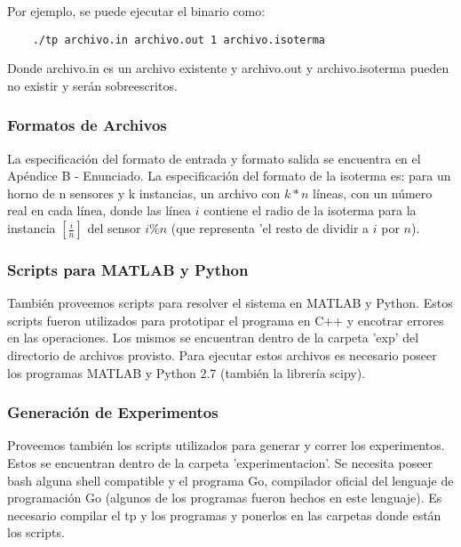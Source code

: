 Por ejemplo, se puede ejecutar el binario como:

\begin{verbatim}
    ./tp archivo.in archivo.out 1 archivo.isoterma
\end{verbatim}

Donde archivo.in es un archivo existente y archivo.out y archivo.isoterma pueden no existir y serán sobreescritos.

\subsubsection{Formatos de Archivos}

La especificación del formato de entrada y formato salida se encuentra en el Apéndice B - Enunciado.
La especificación del formato de la isoterma es: para un horno de n sensores y k instancias, un archivo con $k * n$ líneas, con un número real en cada línea, donde las línea $i$ contiene el radio de la isoterma para la instancia $[\frac{i}{n}]$ del sensor $i \% n$ (que representa 'el resto de dividir a $i$ por $n$).

\subsubsection{Scripts para MATLAB y Python}

También proveemos scripts para resolver el sistema en MATLAB y Python. Estos scripts fueron utilizados para prototipar el programa en C++ y encotrar errores en las operaciones. Los mismos se encuentran dentro de la carpeta 'exp' del directorio de archivos provisto. Para ejecutar estos archivos es necesario poseer los programas MATLAB y Python 2.7 (también la librería scipy). 

\subsubsection{Generación de Experimentos}

Proveemos también los scripts utilizados para generar  y correr los experimentos. Estos se encuentran dentro de la carpeta 'experimentacion'. Se necesita poseer bash alguna shell compatible y el programa Go, compilador oficial del lenguaje de programación Go (algunos de los programas fueron hechos en este lenguaje). Es necesario compilar el tp y los programas y ponerlos en las carpetas donde están los scripts.
